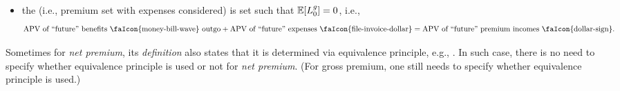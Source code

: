 \begin{enumerate}
\begin{itemize}
\item the  (i.e., premium set with expenses considered) is
set such that \(\mathbb{E}\qty[L_0^g]=0\), i.e.,
\[
\text{APV of ``future'' benefits \faIcon{money-bill-wave} outgo}
+ \text{APV of ``future'' expenses \faIcon{file-invoice-dollar}}
=\text{APV of ``future'' premium incomes \faIcon{dollar-sign}}.
\]
\end{itemize}
\begin{note}
Sometimes for \emph{net premium}, its \emph{definition} also states that it is
determined via equivalence principle, e.g., \textcite{dickson2019actuarial}. In
such case, there is no need to specify whether equivalence principle is used or
not for \emph{net premium}. (For gross premium, one still needs to specify
whether equivalence principle is used.)
\end{note}
\end{enumerate}

